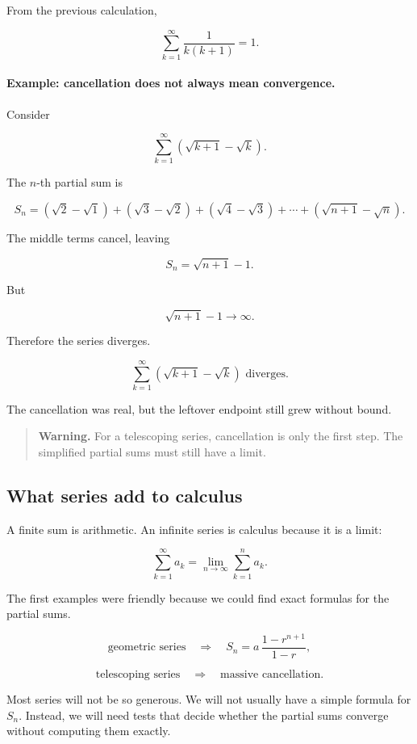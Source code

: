 From the previous calculation,

\[
\boxed{
\sum_{k=1}^{\infty}\frac1{k(k+1)}=1.
}
\]

\paragraph{Example: cancellation does not always mean convergence.}
Consider

\[
\sum_{k=1}^{\infty}\left(\sqrt{k+1}-\sqrt{k}\right).
\]

The \(n\)-th partial sum is

\[
S_n
=
(\sqrt2-\sqrt1)
+
(\sqrt3-\sqrt2)
+
(\sqrt4-\sqrt3)
+\cdots+
(\sqrt{n+1}-\sqrt n).
\]

The middle terms cancel, leaving

\[
S_n=\sqrt{n+1}-1.
\]

But

\[
\sqrt{n+1}-1\to\infty.
\]

Therefore the series diverges.

\[
\boxed{
\sum_{k=1}^{\infty}\left(\sqrt{k+1}-\sqrt{k}\right)
\text{ diverges.}
}
\]

The cancellation was real, but the leftover endpoint still grew without bound.

\begin{quote}
\textbf{Warning.}
For a telescoping series, cancellation is only the first step.  The simplified partial sums
must still have a limit.
\end{quote}

\subsection{What series add to calculus}
\label{subsec:what-series-add-to-calculus}

A finite sum is arithmetic.  An infinite series is calculus because it is a limit:

\[
\sum_{k=1}^{\infty}a_k
=
\lim_{n\to\infty}\sum_{k=1}^{n}a_k.
\]

The first examples were friendly because we could find exact formulas for the partial
sums.

\[
\text{geometric series}
\quad\Longrightarrow\quad
S_n=a\,\frac{1-r^{n+1}}{1-r},
\]

\[
\text{telescoping series}
\quad\Longrightarrow\quad
\text{massive cancellation}.
\]

Most series will not be so generous.  We will not usually have a simple formula for
\(S_n\).  Instead, we will need tests that decide whether the partial sums converge
without computing them exactly.

